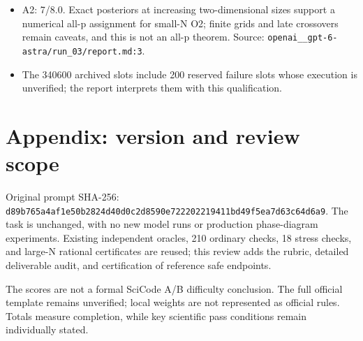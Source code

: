 \documentclass[11pt,a4paper]{article}
\begin{document}
\begin{itemize}
\item A2: 7/\allowbreak{}8.0. Exact posteriors at increasing two-dimensional sizes support a numerical all-p assignment for small-N O2; finite grids and late crossovers remain caveats, and this is not an all-p theorem. Source: \nolinkurl{openai__gpt-6-astra/run_03/report.md:3}.
\item The 340600 archived slots include 200 reserved failure slots whose execution is unverified; the report interprets them with this qualification.
\end{itemize}

\section*{Appendix: version and review scope}

Original prompt SHA-256: \nolinkurl{d89b765a4af1e50b2824d40d0c2d8590e722202219411bd49f5ea7d63c64d6a9}. The task is unchanged, with no new model runs or production phase-diagram experiments. Existing independent oracles, 210 ordinary checks, 18 stress checks, and large-N rational certificates are reused; this review adds the rubric, detailed deliverable audit, and certification of reference safe endpoints.

The scores are not a formal SciCode A/\allowbreak{}B difficulty conclusion. The full official template remains unverified; local weights are not represented as official rules. Totals measure completion, while key scientific pass conditions remain individually stated.
\end{document}
